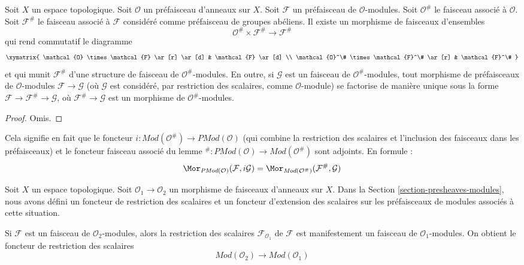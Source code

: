 \begin{lemma}
\label{lemma-sheafification-presheaf-modules}
Soit $X$ un espace topologique.
Soit $\mathcal{O}$ un préfaisceau d'anneaux sur $X$.
Soit $\mathcal{F}$ un préfaisceau de $\mathcal{O}$-modules.
Soit $\mathcal{O}^\#$ le faisceau associé à $\mathcal{O}$.
Soit $\mathcal{F}^\#$ le faisceau associé à $\mathcal{F}$
considéré comme préfaisceau de groupes abéliens. Il existe un morphisme de
faisceaux d'ensembles
$$
\mathcal{O}^\# \times \mathcal{F}^\#
\longrightarrow
\mathcal{F}^\#
$$
qui rend commutatif le diagramme
$$
\xymatrix{
\mathcal{O} \times \mathcal{F} \ar[r] \ar[d] &
\mathcal{F} \ar[d] \\
\mathcal{O}^\# \times \mathcal{F}^\# \ar[r] &
\mathcal{F}^\#
}
$$
et qui munit $\mathcal{F}^\#$ d'une structure de faisceau
de $\mathcal{O}^\#$-modules. En outre, si $\mathcal{G}$
est un faisceau de $\mathcal{O}^\#$-modules, tout morphisme
de préfaisceaux de $\mathcal{O}$-modules $\mathcal{F} \to \mathcal{G}$
(où $\mathcal{G}$ est considéré, par restriction des scalaires, comme $\mathcal{O}$-module)
se factorise de manière unique sous la forme $\mathcal{F} \to \mathcal{F}^\# \to \mathcal{G}$,
où $\mathcal{F}^\# \to \mathcal{G}$ est un morphisme de
$\mathcal{O}^\#$-modules.
\end{lemma}

\begin{proof}
Omis.
\end{proof}

\noindent
Cela signifie en fait que le foncteur
$i : \textit{Mod}(\mathcal{O}^\#) \to \textit{PMod}(\mathcal{O})$
(qui combine la restriction des scalaires et l'inclusion des faisceaux dans les préfaisceaux)
et le foncteur faisceau associé du lemme
${}^\# : \textit{PMod}(\mathcal{O}) \to \textit{Mod}(\mathcal{O}^\#)$
sont adjoints. En formule :
$$
\Mor_{\textit{PMod}(\mathcal{O})}(\mathcal{F}, i\mathcal{G})
=
\Mor_{\textit{Mod}(\mathcal{O}^\#)}(\mathcal{F}^\#, \mathcal{G})
$$

\medskip\noindent
Soit $X$ un espace topologique.
Soit $\mathcal{O}_1 \to \mathcal{O}_2$ un
morphisme de faisceaux d'anneaux sur $X$.
Dans la Section \ref{section-presheaves-modules},
nous avons défini un foncteur de restriction des scalaires
et un foncteur d'extension des scalaires sur les préfaisceaux de modules
associés à cette situation.

\medskip\noindent
Si $\mathcal{F}$ est un faisceau de $\mathcal{O}_2$-modules,
alors la restriction des scalaires $\mathcal{F}_{\mathcal{O}_1}$
de $\mathcal{F}$ est manifestement un faisceau
de $\mathcal{O}_1$-modules. On obtient le foncteur de restriction des scalaires
$$
\textit{Mod}(\mathcal{O}_2)
\longrightarrow
\textit{Mod}(\mathcal{O}_1)
$$

